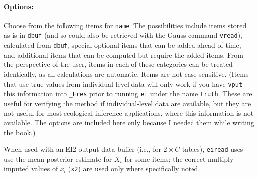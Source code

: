 \documentclass[11pt,titlepage]{article}
\begin{document}
\paragraph{\underline{Options}:}
Choose from the following items for \texttt{name}.  The possibilities
include items stored as is in \texttt{dbuf} (and so could also be
retrieved with the Gauss command \texttt{vread}), calculated from
\texttt{dbuf}, special optional items that can be added ahead of time,
and additional items that can be computed but require the added items.
From the perspective of the user, items in each of these categories
can be treated identically, as all calculations are automatic.  Items
are not case sensitive.  (Items that use true values from
individual-level data will only work if you have \texttt{vput} this
information into \texttt{\_Eres} prior to running \texttt{ei} under
the name \texttt{truth}.  These are useful for verifying the method if
individual-level data are available, but they are not useful for most
ecological inference applications, where this information is not
available.  The options are included here only because I needed them
while writing the book.)

When used with an EI2 output data buffer (i.e., for $2\times C$
tables), \texttt{eiread} uses use the mean posterior estimate for
$X_i$ for some items; the correct multiply imputed values of $x_i$
(\texttt{x2}) are used only where specifically noted.
\end{document}
